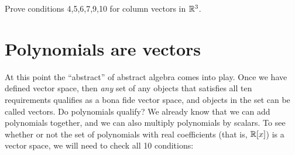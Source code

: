 %
%

\begin{exercise}{}
Prove conditions 4,5,6,7,9,10 for column vectors in $\mathbb{R}^3$.
\end{exercise}

\section{Polynomials are vectors}\label{sec:polyAreVec}

At this point the ``abstract''  of abstract algebra comes into play. Once we have defined vector space, then \emph{any} set of any objects that satisfies all ten requirements qualifies as a bona fide vector space, and objects in the set can be called vectors. Do polynomials qualify? We already know that we can add polynomials together, and we can also multiply polynomials by  scalars. To see whether or not the set of polynomials with real coefficients (that is, $\mathbb{R}[x]$) is a vector space, we will need to check all 10 conditions: 
\medskip{}

